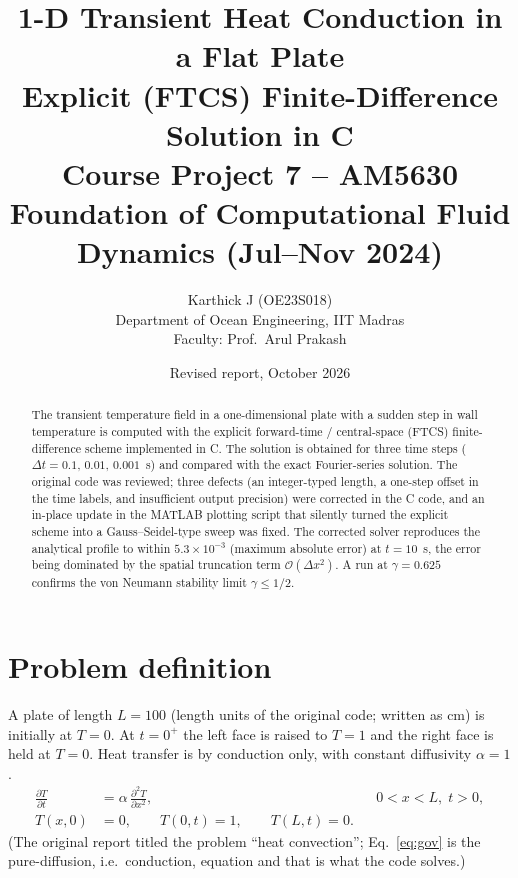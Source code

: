 
\title{\textbf{1-D Transient Heat Conduction in a Flat Plate}\\[2pt]\large Explicit (FTCS) Finite-Difference Solution in C\\[2pt]\normalsize Course Project 7 -- AM5630 Foundation of Computational Fluid Dynamics (Jul--Nov 2024)}
\author{Karthick J (OE23S018)\\Department of Ocean Engineering, IIT Madras\\Faculty: Prof.\ Arul Prakash}
\date{Revised report, October 2026}
\maketitle
\begin{abstract}
The transient temperature field in a one-dimensional plate with a sudden step in wall temperature is computed with the explicit forward-time / central-space (FTCS) finite-difference scheme implemented in C. The solution is obtained for three time steps ($\Delta t=0.1,\,0.01,\,0.001$~s) and compared with the exact Fourier-series solution. The original code was reviewed; three defects (an integer-typed length, a one-step offset in the time labels, and insufficient output precision) were corrected in the C code, and an in-place update in the MATLAB plotting script that silently turned the explicit scheme into a Gauss--Seidel-type sweep was fixed. The corrected solver reproduces the analytical profile to within $5.3\times10^{-3}$ (maximum absolute error) at $t=10$~s, the error being dominated by the spatial truncation term $\mathcal{O}(\Delta x^2)$. A run at $\gamma=0.625$ confirms the von Neumann stability limit $\gamma\le 1/2$.
\end{abstract}
\tableofcontents\newpage

\section{Problem definition}
A plate of length $L=100$ (length units of the original code; written as cm) is initially at $T=0$. At $t=0^+$ the left face is raised to $T=1$ and the right face is held at $T=0$. Heat transfer is by conduction only, with constant diffusivity $\alpha=1$.
\begin{align}
\frac{\partial T}{\partial t} &= \alpha\,\frac{\partial^2 T}{\partial x^2}, && 0<x<L,\; t>0, \label{eq:gov}\\
T(x,0)&=0, \qquad T(0,t)=1, \qquad T(L,t)=0. \nonumber
\end{align}
(The original report titled the problem ``heat convection''; Eq.~\eqref{eq:gov} is the pure-diffusion, i.e.\ conduction, equation and that is what the code solves.)

